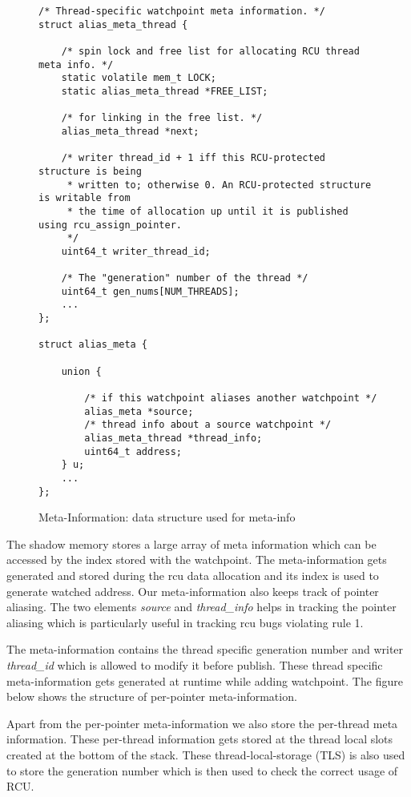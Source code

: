 \begin{figure*}[h]
\centering
\begin{lstlisting}
/* Thread-specific watchpoint meta information. */
struct alias_meta_thread {

    /* spin lock and free list for allocating RCU thread meta info. */
    static volatile mem_t LOCK;
    static alias_meta_thread *FREE_LIST;

    /* for linking in the free list. */
    alias_meta_thread *next;

    /* writer thread_id + 1 iff this RCU-protected structure is being
     * written to; otherwise 0. An RCU-protected structure is writable from
     * the time of allocation up until it is published using rcu_assign_pointer.
     */
    uint64_t writer_thread_id;

    /* The "generation" number of the thread */
    uint64_t gen_nums[NUM_THREADS];
    ...
};

struct alias_meta {

    union {

        /* if this watchpoint aliases another watchpoint */
        alias_meta *source;
        /* thread info about a source watchpoint */
        alias_meta_thread *thread_info;
        uint64_t address;
    } u;
    ...
}; 
\end{lstlisting}
\caption{Meta-Information: data structure used for meta-info}\label{fig:metainfo}
\end{figure*}

The shadow memory stores a large array of meta information which can be accessed by the index stored with the watchpoint. The meta-information gets generated and stored during the rcu data allocation and its index is used to generate watched address. Our meta-information also keeps track of pointer aliasing. The two elements \emph{source} and \emph{thread\_info} helps in tracking the pointer aliasing which is particularly useful in tracking rcu bugs violating rule 1.

The meta-information contains the thread specific generation number and writer \emph{thread\_id} which is allowed to modify it before publish. These thread specific meta-information gets generated at runtime while adding watchpoint. The figure below shows the structure of per-pointer meta-information.

Apart from the per-pointer meta-information we also store the per-thread meta information. These per-thread information gets stored at the thread local slots created at the bottom of the stack. These thread-local-storage (TLS) is also used to store the generation number which is then used to check the correct usage of RCU.

